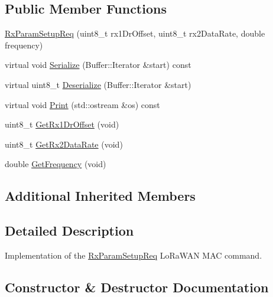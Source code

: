 \subsection*{Public Member Functions}
\begin{DoxyCompactItemize}
\item 
\hyperlink{classns3_1_1lorawan_1_1RxParamSetupReq_aa1c14643797c56793f466be04b92b536}{Rx\+Param\+Setup\+Req} (uint8\+\_\+t rx1\+Dr\+Offset, uint8\+\_\+t rx2\+Data\+Rate, double frequency)
\item 
virtual void \hyperlink{classns3_1_1lorawan_1_1RxParamSetupReq_a61e2907f1dc9f06dd1e9cbd45a5583a1}{Serialize} (Buffer\+::\+Iterator \&start) const
\item 
virtual uint8\+\_\+t \hyperlink{classns3_1_1lorawan_1_1RxParamSetupReq_a9f320ecc2f1bf898465bcc6032fc2076}{Deserialize} (Buffer\+::\+Iterator \&start)
\item 
virtual void \hyperlink{classns3_1_1lorawan_1_1RxParamSetupReq_a92e0695decb4f9d8ba29bcb83168c386}{Print} (std\+::ostream \&os) const
\item 
uint8\+\_\+t \hyperlink{classns3_1_1lorawan_1_1RxParamSetupReq_a3b1dead7733bc5b47cecbd1b5a673f82}{Get\+Rx1\+Dr\+Offset} (void)
\item 
uint8\+\_\+t \hyperlink{classns3_1_1lorawan_1_1RxParamSetupReq_a89462a466ee10c28f4ded25b6b3b9dda}{Get\+Rx2\+Data\+Rate} (void)
\item 
double \hyperlink{classns3_1_1lorawan_1_1RxParamSetupReq_aeb4c2b794d0afa15797ce99c1543609a}{Get\+Frequency} (void)
\end{DoxyCompactItemize}
\subsection*{Additional Inherited Members}


\subsection{Detailed Description}
Implementation of the \hyperlink{classns3_1_1lorawan_1_1RxParamSetupReq}{Rx\+Param\+Setup\+Req} Lo\+Ra\+W\+AN M\+AC command. 

\subsection{Constructor \& Destructor Documentation}
\mbox{\label{classns3_1_1lorawan_1_1RxParamSetupReq_aa1c14643797c56793f466be04b92b536}} 
